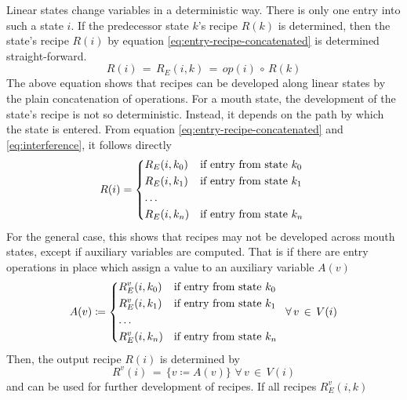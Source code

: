 \documentclass[12pt,a4paper]{scrartcl}
\begin{document}
Linear states change variables in a deterministic way. There is only one entry
into such a state $i$. If the predecessor state $k$'s recipe $R(k)$ is
determined, then the state's recipe $R(i)$ by equation \eqref{eq:entry-recipe-concatenated} 
is determined straight-forward.
\begin{equation} \label{eq:linear-state-recipe}
    R(i) \,=\,R_E(i,k) \,=\, op(i)\,\circ\,R(k)
\end{equation}
The above equation shows that recipes can be developed along linear states by
the plain concatenation of operations.  For a mouth state, the development of the
state's recipe is not so deterministic.  Instead, it depends on the path by
which the state is entered.  From equation \eqref{eq:entry-recipe-concatenated}
and \eqref{eq:interference}, it follows directly
\begin{equation} \label{eq:mouth-state-recipe}
    R(i) = \begin{dcases*}
             R_E(i,k_0) & if entry from state $k_0$ \\
             R_E(i,k_1) & if entry from state $k_1$ \\
             \ldots \\
             R_E(i,k_n) & if entry from state $k_n$ \\
            \end{dcases*}
\end{equation}
For the general case, this shows that recipes may not be developed across
mouth states, except if auxiliary variables are computed. That is if there
are entry operations in place which assign a value to an auxiliary variable $A(v)$
\begin{equation}
    A(v) \coloneqq   \begin{dcases*}
             R^v_E(i,k_0) & if entry from state $k_0$ \\
             R^v_E(i,k_1) & if entry from state $k_1$ \\
             \ldots \\
             R^v_E(i,k_n) & if entry from state $k_n$ \\
            \end{dcases*}
            \,\forall\,v\,\in\,V(i)
\end{equation}
Then, the output recipe $R(i)$ is determined by
\begin{equation}
    R^v(i) \,=\, \{ v \coloneqq A(v) \}\,\,\forall\,v\,\in\,V(i)
\end{equation}
and can be used for further development of recipes. If all recipes $R^v_E(i,k)$
\end{document}
